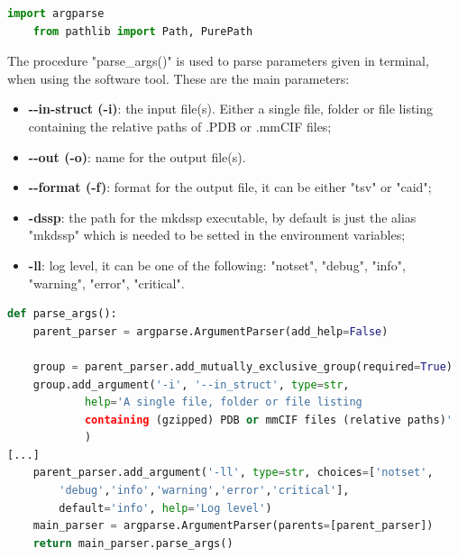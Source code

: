 \begin{lstlisting}[language=Python, caption=Import\ libraries\ parsing, label={code:parseargs}]
    import argparse
    from pathlib import Path, PurePath
\end{lstlisting}

The procedure "parse\_args()" is used to parse parameters given in terminal, when using the software tool. These are the main parameters:
\begin{itemize}
    \item \textbf{-\vspace{0.1cm}-in-struct (-i)}: the input file(s). Either a single file, folder or file listing containing the relative paths of .PDB or .mmCIF files;
    \item \textbf{-\vspace{0.1cm}-out (-o)}: name for the output file(s).
    \item \textbf{-\vspace{0.1cm}-format (-f)}: format for the output file, it can be either "tsv" or "caid";
    \item \textbf{-dssp}: the path for the mkdssp executable, by default is just the alias "mkdssp" which is needed to be setted in the environment variables;
    \item \textbf{-ll}: log level, it can be one of the following: "notset", "debug", "info", "warning", "error", "critical".
\end{itemize}

\begin{lstlisting}[language=Python, caption=Command-line\ arguments\ parsing.]
def parse_args():
    parent_parser = argparse.ArgumentParser(add_help=False)

    group = parent_parser.add_mutually_exclusive_group(required=True)
    group.add_argument('-i', '--in_struct', type=str,
            help='A single file, folder or file listing 
            containing (gzipped) PDB or mmCIF files (relative paths)'
            )   
[...]
    parent_parser.add_argument('-ll', type=str, choices=['notset',
        'debug','info','warning','error','critical'], 
        default='info', help='Log level')
    main_parser = argparse.ArgumentParser(parents=[parent_parser])
    return main_parser.parse_args()
\end{lstlisting}

\pagebreak

